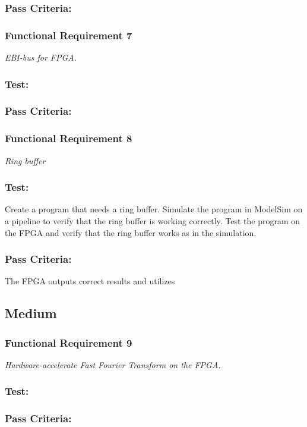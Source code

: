 \subsubsection*{Pass Criteria:}


\subsubsection*{Functional Requirement 7}
\textit{EBI-bus for FPGA.}
\subsubsection*{Test:}
\subsubsection*{Pass Criteria:}


\subsubsection*{Functional Requirement 8}
\textit{Ring buffer}
\subsubsection*{Test:}
Create a program that needs a ring buffer. 
Simulate the program in ModelSim on a pipeline to verify that the ring buffer is working correctly.
Test the program on the FPGA and verify that the ring buffer works as in the simulation.
\subsubsection*{Pass Criteria:}
The FPGA outputs correct results and utilizes 


\subsection{Medium}
\subsubsection*{Functional Requirement 9}
\textit{Hardware-accelerate Fast Fourier Transform on the FPGA.}
\subsubsection*{Test:}
\subsubsection*{Pass Criteria:}

